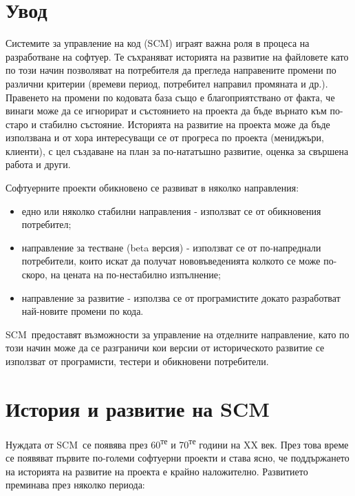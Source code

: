 \documentclass[a4paper]{article}
\def\SCM{SCM}
\begin{document}

\section{Увод}
Системите за управление на код (\SCM) играят важна роля в процеса на
разработване на софтуер. Те съхраняват историята на развитие на файловете като
по този начин позволяват на потребителя да прегледа направените промени по
различни критерии (времеви период, потребител направил промяната и др.).
Правенето на промени по кодовата база също е благоприятствано от факта, че
винаги може да се игнорират и състоянието на проекта да бъде върнато към
по-старо и стабилно състояние. Историята на развитие на проекта може да бъде
използвана и от хора интересуващи се от прогреса по проекта (мениджъри,
клиенти), с цел създаване на план за по-нататъшно развитие, оценка за свършена
работа и други.


Софтуерните проекти обикновено се развиват в няколко направления:
\begin{itemize}
  \item едно или няколко стабилни направления - използват се от обикновения
  потребител;
  \item направление за тестване (beta версия) - използват се от по-напреднали
  потребители, които искат да получат нововъведенията колкото се може по-скоро,
  на цената на по-нестабилно изпълнение;
  \item направление за развитие - използва се от програмистите докато
  разработват най-новите промени по кода.
\end{itemize}


\SCM\ предоставят възможности за управление на отделните направление, като по
този начин може да се разграничи кои версии от историческото развитие се
използват от програмисти, тестери и обикновени потребители.

\section{История и развитие на \SCM}
Нуждата от \SCM\ се появява през 60\textsuperscript{те} и
70\textsuperscript{те} години на XX век. През
това време се появяват първите по-големи софтуерни проекти и става ясно, че
поддържането на историята на развитие на проекта е крайно наложително.
Развитието преминава през няколко периода:
\end{document}
